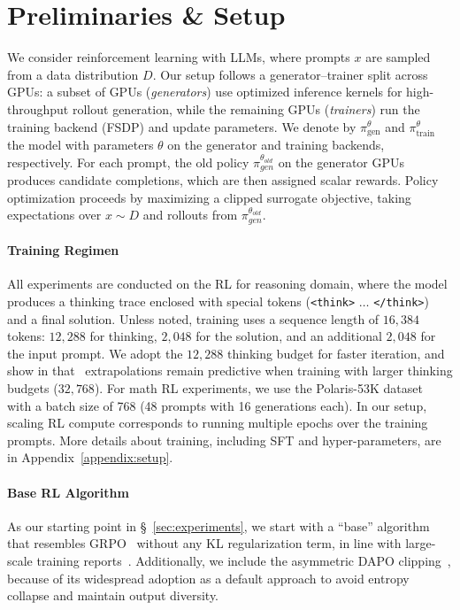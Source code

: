 \section{Preliminaries \& Setup}
\label{sec:methodology}

We consider reinforcement learning with LLMs, where prompts $x$ are sampled from a data distribution $D$. 
Our setup follows a generator–trainer split across GPUs: a subset of GPUs (\emph{generators}) use optimized inference kernels for high-throughput rollout generation, while the remaining GPUs (\emph{trainers}) run the training backend (FSDP) and update parameters. 
We denote by $\pi_{\text{gen}}^\theta$ and $\pi_{\text{train}}^\theta$ the model with parameters $\theta$ on the generator and training backends, respectively. 
For each prompt, the old policy $\pi_{gen}^{\theta_{old}}$ on the generator GPUs produces candidate completions, which are then assigned scalar rewards. 
Policy optimization proceeds by maximizing a clipped surrogate objective, taking expectations over $x \sim D$ and rollouts from $\pi_{gen}^{\theta_{old}}$.


\paragraph{Training Regimen}
All experiments are conducted on the RL for reasoning domain, where the model produces a thinking trace enclosed with special tokens (\texttt{<think>} $\ldots$ \texttt{</think>}) and a final solution. Unless noted, training uses a sequence length of $16,384$ tokens: $12,288$ for thinking, $2,048$ for the solution, and an additional $2,048$ for the input prompt. We adopt the $12,288$ thinking budget for faster iteration, and show in  that \scalerl\ extrapolations remain predictive when training with larger thinking budgets ($32,768$). For math RL experiments, we use the Polaris-53K dataset~\citep{polaris2025} with a batch size of 768 (48 prompts with 16 generations each). %
In our setup, scaling RL compute corresponds to running multiple epochs over the training prompts. More details about training, including SFT and hyper-parameters, are in Appendix~\ref{appendix:setup}.


\paragraph{Base RL Algorithm}
As our starting point in \S~\ref{sec:experiments}, we start with a ``base'' algorithm that resembles GRPO~\citep{shao2024deepseekmath} without any KL regularization term, in line with large-scale training reports~\citep{rastogi2025magistral,minimax_m1}. Additionally, we include the asymmetric DAPO clipping~\citep{yu2025dapo}, because of its widespread adoption as a default approach to avoid entropy collapse and maintain output diversity. 

